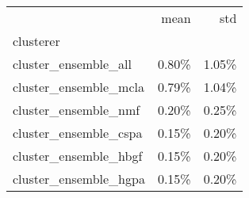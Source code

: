 \begin{tabular}{lrr}
\toprule
{} &  mean &   std \\
clusterer             &       &       \\
\midrule
cluster\_ensemble\_all  & 0.80\% & 1.05\% \\
cluster\_ensemble\_mcla & 0.79\% & 1.04\% \\
cluster\_ensemble\_nmf  & 0.20\% & 0.25\% \\
cluster\_ensemble\_cspa & 0.15\% & 0.20\% \\
cluster\_ensemble\_hbgf & 0.15\% & 0.20\% \\
cluster\_ensemble\_hgpa & 0.15\% & 0.20\% \\
\bottomrule
\end{tabular}

